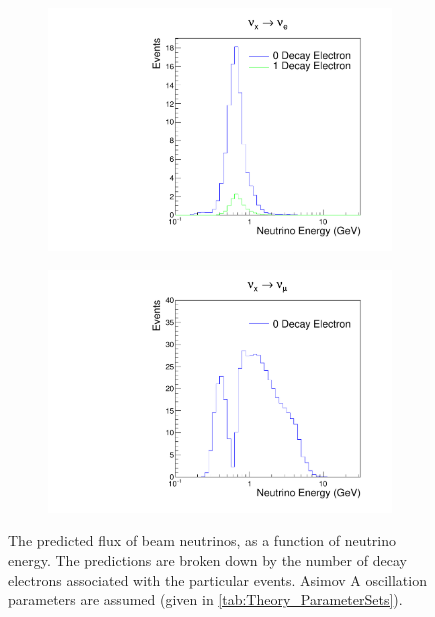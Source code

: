 \begin{figure}[h]
  \begin{subfigure}[t]{0.49\textwidth}
    \includegraphics[width=\textwidth, trim={0mm 0mm 0mm 0mm}, clip,page=1]{Figures/Simulations/NeutrinoEnergyDist_T2K_NuE.pdf}
  \end{subfigure}%
  \begin{subfigure}[t]{0.49\textwidth}
    \includegraphics[width=\textwidth, trim={0mm 0mm 0mm 0mm}, clip,page=1]{Figures/Simulations/NeutrinoEnergyDist_T2K_NuMu.pdf}
  \end{subfigure}
  \caption{The predicted flux of beam neutrinos, as a function of neutrino energy. The predictions are broken down by the number of decay electrons associated with the particular events. Asimov A oscillation parameters are assumed (given in \autoref{tab:Theory_ParameterSets}).}
  \label{fig:Simulations_NeutrinoEnergyDistribution_T2K}
\end{figure}
